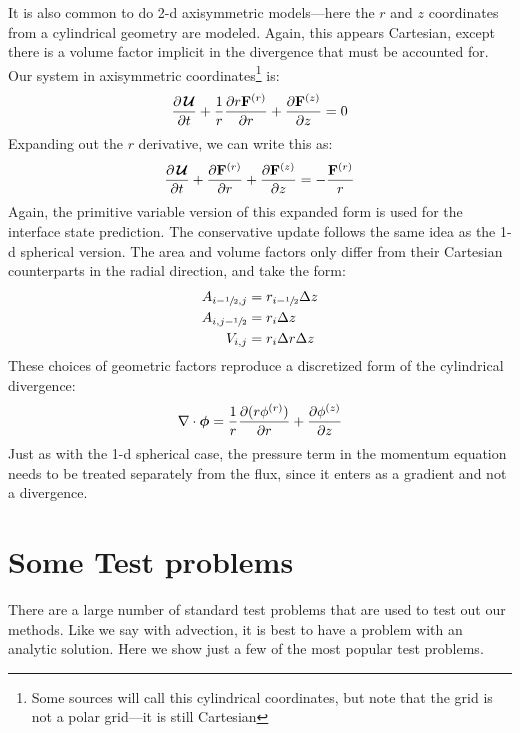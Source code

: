 It is also common to do 2-d axisymmetric models---here the $r$ and $z$
coordinates from a cylindrical geometry are modeled.  Again, this
appears Cartesian, except there is a volume factor implicit in the
divergence that must be accounted for.  Our system in axisymmetric
coordinates\footnote{Some sources will call this cylindrical
  coordinates, but note that the grid is not a polar grid---it is
  still Cartesian} is:
\begin{equation}
\frac{\partial {\,\boldsymbol{\mathcal{U}}}}{\partial t}
  + \frac{1}{r}\frac{\partial r {\bf F}^{(r)}}{\partial r}
  + \frac{\partial {\bf F}^{(z)}}{\partial z} = 0
\end{equation}
Expanding out the $r$ derivative, we can write this as:
\begin{equation}
\frac{\partial {\,\boldsymbol{\mathcal{U}}}}{\partial t}
  + \frac{\partial {\bf F}^{(r)}}{\partial r}
  + \frac{\partial {\bf F}^{(z)}}{\partial z} = -\frac{{\bf F}^{(r)}}{r}
\end{equation}
Again, the primitive variable version of this expanded form is used
for the interface state prediction.  The conservative update
follows the same idea as the 1-d spherical version.  The area
and volume factors only differ from their Cartesian counterparts
in the radial direction, and take the form:
\begin{align}
A_{i-{\sfrac{1}{2}},j} &= r_{i-{\sfrac{1}{2}}} \Delta z \\
A_{i,j-{\sfrac{1}{2}}} &= r_i \Delta z\\
V_{i,j} &= r_i \Delta r \Delta z
\end{align}
These choices of geometric factors reproduce a discretized
form of the cylindrical divergence:
\begin{equation}
\nabla \cdot {\boldsymbol{\phi}} = \frac{1}{r} {\frac{{\partial(r\phi^{(r)})}}{\partial r}} + {\frac{{\partial\phi^{(z)}}}{\partial z}}
\end{equation}
Just as with the 1-d spherical case, the pressure term in the momentum
equation needs to be treated separately from the flux, since it enters
as a gradient and not a divergence.


\section{Some Test problems}

There are a large number of standard test problems that are used to
test out our methods.  Like we say with advection, it is best to have
a problem with an analytic solution.  Here we show just a few of the most
popular test problems.

